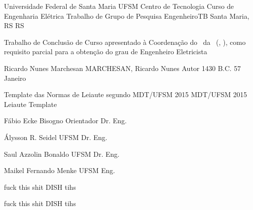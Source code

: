\set{\universidade}				{Universidade Federal de Santa Maria}
\set{\universidadeSigla}		{UFSM}
\set{\centroCurso}				{Centro de Tecnologia}
\set{\departamentoPrograma}		{Curso de Engenharia Elétrica}
\set{\grauTrabalho}				{Trabalho de Grupo de Pesquisa}
\set{\grauTitulacao}			{EngenheiroTB}
\set{\cidadeCEP}				{Santa Maria, RS}
\set{\estadoCEP}				{RS}

\set{\textoFolhaRosto}			{Trabalho de Conclusão de Curso apresentado à Coordenação do \departamentoPrograma\ da \universidade\ (\universidadeSigla , \estadoCEP), como requisito parcial para a obtenção do grau de}
\set{\grauFolhaRosto}			{Engenheiro Eletricista}


\set{\autor}					{Ricardo Nunes Marchesan}
\set{\autorCitacao}				{MARCHESAN, Ricardo Nunes}
\set{\autorGenero}				{Autor}
\set{\ano}						{1430 B.C.}
\set{\diaDefesa}				{57}
\set{\mesDefesa}				{Janeiro}

\set{\tituloTrabalho}			{Template das Normas de Leiaute segundo MDT/UFSM 2015}
\set{\tituloTrabalhoEn}			{MDT/UFSM 2015 Leiaute Template}


\set{\orientador}				{Fábio Ecke Bisogno}
\set{\orientadorGenero}			{Orientador}
\set{\orientadorTitulo}			{Dr. Eng.}

\set{\bancaUm}					{Álysson R. Seidel}
\set{\bancaUmSigla}				{UFSM}
\set{\bancaUmTitulo}			{Dr. Eng.}

\set{\bancaDois}				{Saul Azzolin Bonaldo}
\set{\bancaDoisSigla}			{UFSM}
\set{\bancaDoisTitulo}			{Dr. Eng.}

\set{\bancaTres}				{Maikel Fernando Menke}
\set{\bancaTresSigla}			{UFSM}
\set{\bancaTresTitulo}			{Eng.}

\set{\bancaQuatro}				{fuck this shit}
\set{\bancaQuatroSigla}			{DISH}
\set{\bancaQuatroTitulo}		{tihs}

\set{\bancaCinco}				{fuck this shit}
\set{\bancaCincoSigla}			{DISH}
\set{\bancaCincoTitulo}			{tihs}
